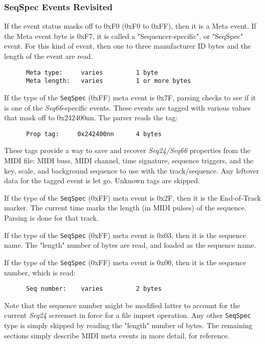 \subsubsection{SeqSpec Events Revisited}
\label{subsubsec:midi_format_seqspec_events_revisited}

   If the event status masks off to 0xF0 (0xF0 to 0xFF), then it is a Meta
   event.  If the Meta event byte is 0xF7, it is called a "Sequencer-specific",
   or "SeqSpec" event.  For this kind of event, then one to three manufacturer
   ID bytes and the length of the event are read.

   \begin{verbatim}
      Meta type:     varies         1 byte
      Meta length:   varies         1 or more bytes
   \end{verbatim}

   If the type of the
   \texttt{SeqSpec} (0xFF) meta event is 0x7F, parsing checks to see
   if it is one of the \textsl{Seq66}-specific events.  These events are tagged
   with various values that mask off to 0x242400nn.  The parser reads the
   tag:

   \begin{verbatim}
      Prop tag:     0x242400nn      4 bytes
   \end{verbatim}

   These tags provide a way to save and recover \textsl{Seq24/Seq66} properties
   from the MIDI file: MIDI buss, MIDI channel, time signature, sequence
   triggers, and the key, scale, and background sequence to use with the
   track/sequence.  Any leftover data for the tagged event is let go.
   Unknown tags are skipped.

   If the type of the
   \texttt{SeqSpec} (0xFF) meta event is 0x2F, then it is the
   End-of-Track marker.  The current time marks the length (in MIDI pulses) of
   the sequence.  Parsing is done for that track.

   If the type of the
   \texttt{SeqSpec} (0xFF) meta event is 0x03, then it is the
   sequence name.  The "length" number of bytes are read, and loaded as the
   sequence name.

   If the type of the
   \texttt{SeqSpec} (0xFF) meta event is 0x00, then it is the
   sequence number, which is read:

   \begin{verbatim}
      Seq number:    varies         2 bytes
   \end{verbatim}

   Note that the sequence number might be modified latter to account for the
   current \textsl{Seq24} screenset in force for a file import operation.
   Any other \texttt{SeqSpec} type is simply skipped by reading the "length"
   number of bytes.
   The remaining sections simply describe MIDI meta events in more detail, for
   reference.

